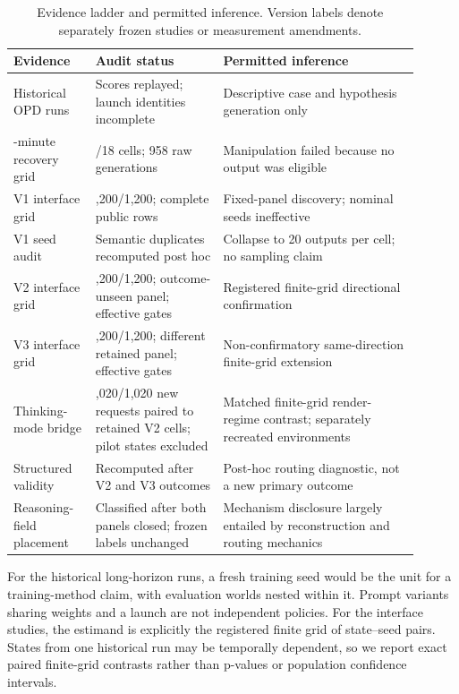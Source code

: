 \documentclass[10pt]{article}
\begin{document}
\begin{table}[H]
\caption{Evidence ladder and permitted inference. Version labels denote
separately frozen studies or measurement amendments.}
\label{tab:evidence-ladder}
\centering
\small
\begin{tabular}{>{\raggedright\arraybackslash}p{0.18\linewidth}
                >{\raggedright\arraybackslash}p{0.29\linewidth}
                >{\raggedright\arraybackslash}p{0.43\linewidth}}
\toprule
Evidence & Audit status & Permitted inference \\
\midrule
Historical OPD runs & Scores replayed; launch identities incomplete &
Descriptive case and hypothesis generation only \\
30-minute recovery grid & 18/18 cells; 958 raw generations &
Manipulation failed because no output was eligible \\
V1 interface grid & 1,200/1,200; complete public rows &
Fixed-panel discovery; nominal seeds ineffective \\
V1 seed audit & Semantic duplicates recomputed post hoc &
Collapse to 20 outputs per cell; no sampling claim \\
V2 interface grid & 1,200/1,200; outcome-unseen panel; effective gates &
Registered finite-grid directional confirmation \\
V3 interface grid & 1,200/1,200; different retained panel; effective gates &
Non-confirmatory same-direction finite-grid extension \\
Thinking-mode bridge & 1,020/1,020 new requests paired to retained V2 cells;
pilot states excluded & Matched finite-grid render-regime contrast; separately
recreated environments \\
Structured validity & Recomputed after V2 and V3 outcomes &
Post-hoc routing diagnostic, not a new primary outcome \\
Reasoning-field placement & Classified after both panels closed; frozen labels
unchanged & Mechanism disclosure largely entailed by reconstruction and routing
mechanics \\
\bottomrule
\end{tabular}
\end{table}

For the historical long-horizon runs, a fresh training seed would be the unit
for a training-method claim, with evaluation worlds nested within it. Prompt
variants sharing weights and a launch are not independent policies. For the
interface studies, the estimand is explicitly the registered finite grid of
state--seed pairs. States from one historical run may be temporally dependent,
so we report exact paired finite-grid contrasts rather than p-values or
population confidence intervals.
\end{document}
